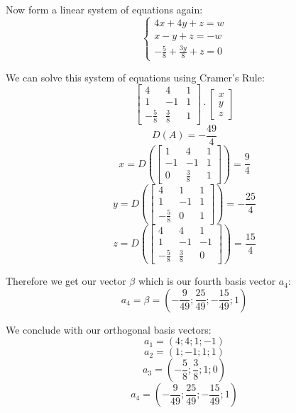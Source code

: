\documentclass[11pt]{article}
\begin{document}
Now form a linear system of equations again:
\[
\left\{
\begin{aligned}
4x + 4y + z = w \\
x-y+z=-w \\
-\frac{5}{8}+\frac{3y}{8}+z=0
\end{aligned}
\]

We can solve this system of equations using Cramer's Rule:
\[
\begin{bmatrix}
4 & 4 & 1 \\
1 & -1 & 1 \\
-\frac{5}{8} & \frac{3}{8} & 1
\end{bmatrix}
\cdot
\begin{bmatrix}
x \\ y \\ z 
\end{bmatrix}
\]
\[
D(A) = -\frac{49}{4}
\]
\[
x = D \left(
\begin{bmatrix}
1 & 4 & 1 \\
-1 & -1 & 1 \\
0 & \frac{3}{8} & 1
\end{bmatrix}
\right) = \frac{9}{4}
\]
\[
y = D \left(
\begin{bmatrix}
4 & 1 & 1 \\
1 & -1 & 1 \\
-\frac{5}{8} & 0 & 1
\end{bmatrix}
\right) = -\frac{25}{4}
\]
\[
z = D \left(
\begin{bmatrix}
4 & 4 & 1 \\
1 & -1 & -1 \\
-\frac{5}{8} & \frac{3}{8} & 0
\end{bmatrix}
\right) = \frac{15}{4}
\]

Therefore we get our vector $\beta$ which is our fourth basis vector $a_4$:
\[
a_4 = \beta = \left( -\frac{9}{49} ; \frac{25}{49} ; -\frac{15}{49} ; 1 \right)
\]

We conclude with our orthogonal basis vectors:
\[
a_1 = (4;4;1;-1)
\]
\[
a_2 = (1;-1;1;1)
\]
\[
a_3 = (-\frac{5}{8};\frac{3}{8};1;0)
\]
\[
a_4 = (-\frac{9}{49};\frac{25}{49};-\frac{15}{49};1) 
\]
\end{document}
